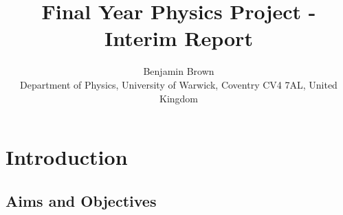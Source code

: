 \documentclass[a4paper,onecolumn,12pt]{article}
\theoremstyle{definition}
\theoremstyle{remark}
\begin{document}
\title{Final Year Physics Project - Interim Report}

\author{Benjamin Brown \\
        \small
        Department of Physics, University of Warwick,
        Coventry CV4 7AL, United Kingdom}
\date{}


\maketitle



\section{Introduction}

\subsection{Aims and Objectives}
\end{document}
